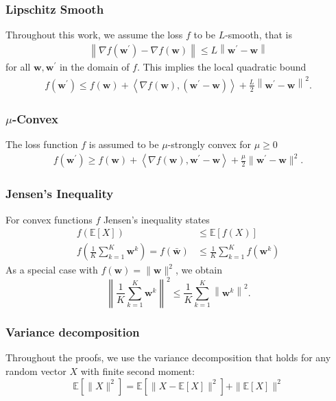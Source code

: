 \documentclass[10pt,twocolumn,letterpaper]{article}
\begin{document}
\subsubsection{Lipschitz Smooth}
Throughout this work, we assume the loss $f$ to be $L$-smooth, that is
\begin{align*}
\left\|\nabla f\left(\mathbf{w}^{\prime}\right)-\nabla f(\mathbf{w})\right\| \leq L\left\|\mathbf{w}^{\prime}-\mathbf{w}\right\|
\end{align*}
for all $\mathbf{w}, \mathbf{w}^{\prime}$ in the domain of $f$. This implies the local quadratic bound
\begin{align*}
f\left(\mathbf{w}^{\prime}\right) \leq f(\mathbf{w}) + \left\langle \nabla f(\mathbf{w}), (\mathbf{w}^{\prime}-\mathbf{w})\right\rangle
+\frac{L}{2}\left\|\mathbf{w}^{\prime}-\mathbf{w}\right\|^2.
\end{align*}
\subsubsection{$\mu$-Convex}
The loss function $f$ is assumed to be $\mu$-strongly convex for $\mu \geq 0$
\begin{align*}
f(\mathbf{w}^{\prime}) \geq f(\mathbf{w}) +\left\langle\nabla f(\mathbf{w}), \mathbf{w}^{\prime}-\mathbf{w} \right\rangle + \frac{\mu}{2}\|\mathbf{w}^{\prime}-\mathbf{w}\|^2.
\end{align*}

\subsubsection{Jensen's Inequality}
For convex functions $f$ Jensen's inequality states
\begin{align*}
    f(\mathbb{E}[X]) &\leq \mathbb{E}[f(X)] \\
    f\left(\frac{1}{K} \sum_{k=1}^K \mathbf{w}^k\right) = f\left(\bar{\mathbf{w}} \right) &\leq \frac{1}{K} \sum_{k=1}^K f\left(\mathbf{w}^k\right)
\end{align*}
As a special case with $f(\mathbf{w})=\|\mathbf{w}\|^2$, we obtain
$$
\left\|\frac{1}{K} \sum_{k=1}^K \mathbf{w}^k\right\|^2 \leq \frac{1}{K} \sum_{k=1}^K\left\|\mathbf{w}^k\right\|^2 .
$$

\subsubsection{Variance decomposition}
Throughout the proofs, we use the variance decomposition that holds for any random vector $X$ with finite second moment:
$$
\mathbb{E}\left[\|X\|^2\right]=\mathbb{E}\left[\|X-\mathbb{E}[X]\|^2\right]+\|\mathbb{E}[X]\|^2
$$
\end{document}
